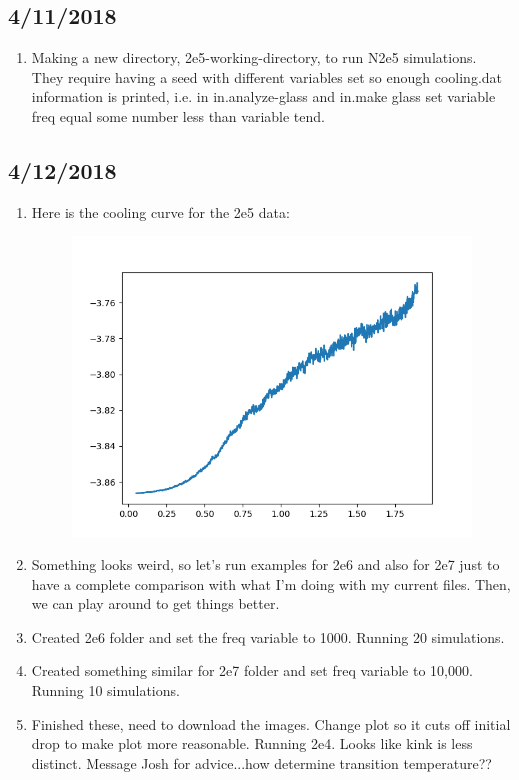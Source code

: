 \documentclass[12pt,reqno]{amsart}
\numberwithin{equation}{section}
\begin{document}
\subsection{4/11/2018}

\begin{enumerate}
\item Making a new directory, 2e5-working-directory, to run N2e5 simulations.  They require having a seed with different variables set so enough cooling.dat information is printed, i.e. in in.analyze-glass and in.make glass set variable freq equal some number less than variable tend.  
\end{enumerate}

\subsection{4/12/2018}

\begin{enumerate}
\item Here is the cooling curve for the 2e5 data:

\begin{figure}[H]
\centering
\includegraphics[scale=0.6]{average_cooling_data_N2e5}
\end{figure}

\item Something looks weird, so let's run examples for 2e6 and also for 2e7 just to have a complete comparison with what I'm doing with my current files. Then, we can play around to get things better. 
\item Created 2e6 folder and set the freq variable to 1000.  Running 20 simulations.
\item Created something similar for 2e7 folder and set freq variable to 10,000.  Running 10 simulations.  
\item Finished these, need to download the images. Change plot so it cuts off initial drop to make plot more reasonable.  Running 2e4.  Looks like kink is less distinct.  Message Josh for advice...how determine transition temperature??

\end{enumerate}
\end{document}
